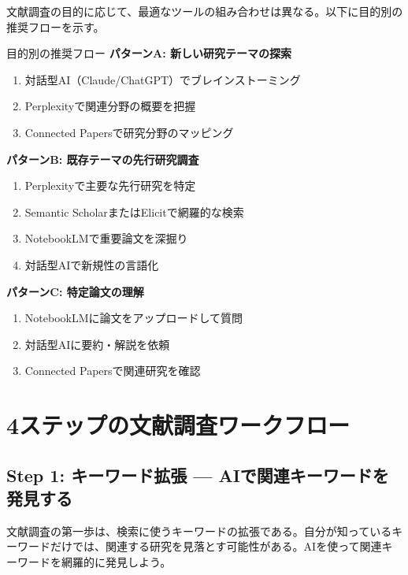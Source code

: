 文献調査の目的に応じて、最適なツールの組み合わせは異なる。以下に目的別の推奨フローを示す。

\begin{itembox}[l]{目的別の推奨フロー}
\textbf{パターンA: 新しい研究テーマの探索}
\begin{enumerate}
\item 対話型AI（Claude/ChatGPT）でブレインストーミング
\item Perplexityで関連分野の概要を把握
\item Connected Papersで研究分野のマッピング
\end{enumerate}

\vspace{3mm}
\textbf{パターンB: 既存テーマの先行研究調査}
\begin{enumerate}
\item Perplexityで主要な先行研究を特定
\item Semantic ScholarまたはElicitで網羅的な検索
\item NotebookLMで重要論文を深掘り
\item 対話型AIで新規性の言語化
\end{enumerate}

\vspace{3mm}
\textbf{パターンC: 特定論文の理解}
\begin{enumerate}
\item NotebookLMに論文をアップロードして質問
\item 対話型AIに要約・解説を依頼
\item Connected Papersで関連研究を確認
\end{enumerate}
\end{itembox}

\section{4ステップの文献調査ワークフロー}
\label{sec:3.3}

\subsection{Step 1: キーワード拡張 --- AIで関連キーワードを発見する}

文献調査の第一歩は、検索に使うキーワードの拡張である。自分が知っているキーワードだけでは、関連する研究を見落とす可能性がある。AIを使って関連キーワードを網羅的に発見しよう。

